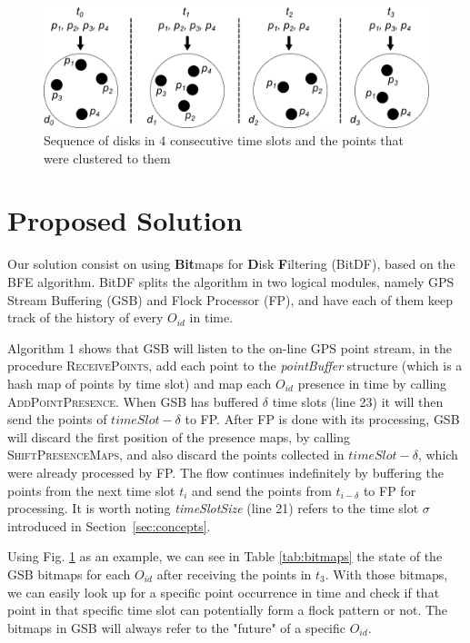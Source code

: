 \begin{figure}
    \centering
    \includegraphics[width=\linewidth]{images/disks_2.png}
    \caption{Sequence of disks in 4 consecutive time slots and the points that were clustered to them}
    \label{fig:disks}
\end{figure}

\section{Proposed Solution}
Our solution consist on using \textbf{Bit}maps for \textbf{D}isk \textbf{F}iltering (BitDF), based on the  BFE
algorithm. BitDF splits the algorithm in two logical modules, namely GPS Stream Buffering (GSB) and Flock Processor
(FP), and have each of them keep track of the history of every $O_{id}$ in time.

Algorithm 1 shows that GSB will listen to the on-line GPS point stream, in the procedure \textsc{ReceivePoints}, add
each point to the \textit{pointBuffer} structure (which is a hash map of points by time slot) and map each $O_{id}$
presence in time by calling \textsc{AddPointPresence}. When GSB has buffered $\delta$ time slots (line 23) it will then
send the points of $timeSlot - \delta$ to FP. After FP is done with its processing, GSB will discard the first position
of the presence maps, by calling \textsc{ShiftPresenceMaps}, and also discard the points collected in $timeSlot -
\delta$, which were already processed by FP. The flow continues indefinitely by buffering the points from the next time
slot $t_i$ and send the points from $t_{i - \delta}$ to FP for processing. It is worth noting \textit{timeSlotSize}
(line 21) refers to the time slot $\sigma$ introduced in Section~\ref{sec:concepts}.

Using Fig. \ref{fig:disks} as an example, we can see in Table \ref{tab:bitmaps} the state of the GSB bitmaps for each
$O_{id}$ after receiving the points in $t_3$. With those bitmaps, we can easily look up for a specific point occurrence
in time and check if that point in that specific time slot can potentially form a flock pattern or not. The bitmaps in
GSB will always refer to the "future" of a specific $O_{id}$.

